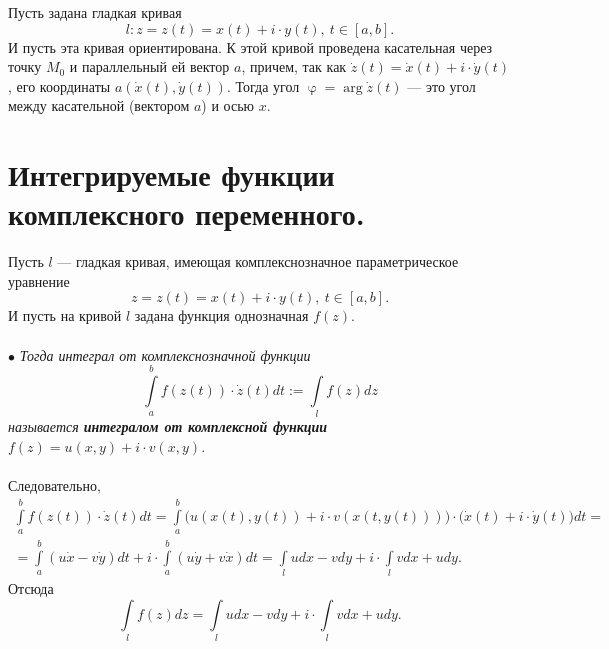 \documentclass[a4paper, 12pt]{article}
\newcommand{\intab}{\int\limits_a^b}
\renewcommand{\varphi}{\upvarphi}
\begin{document}
\hfill
\parbox[b][4.5cm][t]{110mm}{Пусть задана гладкая кривая $$l: z= z(t) = x(t) + i\cdot y(t),\ t\in[a,b].$$ И пусть эта кривая ориентирована. К этой кривой проведена касательная через точку $M_0$ и параллельный ей вектор $a$, причем, так как $\dot{z}(t) = \dot{x}(t) + i\cdot \dot{y}(t)$, его координаты $a(\dot{x}(t), \dot y(t))$. Тогда угол $\varphi = \arg \dot z (t)$ --- это угол между касательной (вектором $a$) и осью $x$.}
\section{Интегрируемые функции комплексного переменного.}
Пусть $l$ --- гладкая кривая, имеющая комплекснозначное параметрическое уравнение $$z= z(t) = x(t) + i\cdot y(t),\ t\in[a,b].$$
И пусть на кривой $l$ задана функция однозначная $f(z)$.\\\\
$\bullet$ \textit{Тогда интеграл от комплекснозначной функции $$\intab f(z(t))\cdot \dot z (t) dt := \int\limits_l f(z)dz$$ называется \textbf{интегралом от комплексной функции} $f(z) = u(x,y) + i \cdot v(x,y)$.}\\\\
Следовательно, \begin{multline*}
	\intab f(z(t))\cdot \dot z (t) dt = \intab\Big(u(x(t),y(t)) + i\cdot v(x(t,y(t)))\Big)\cdot \Big(\dot x(t) + i\cdot \dot y(t)\Big)dt =\\= \intab (u\dot x - v\dot y)dt + i\cdot \intab (u\dot y + v\dot x)dt= \int\limits_l udx - vdy + i\cdot \int\limits_l vdx + udy.
\end{multline*}
Отсюда $$\int\limits_l f(z)dz = \int\limits_l udx - vdy + i\cdot \int\limits_l vdx + udy.$$
\end{document}
